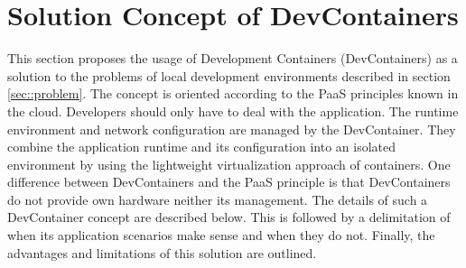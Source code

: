 

\section{Solution Concept of DevContainers}\label{sec::solution_concept}
This section proposes the usage of Development Containers (DevContainers) as a solution to the problems of local development environments described in section \ref{sec::problem}. The concept is oriented according to the \ac{PaaS} principles known in the cloud. Developers should only have to deal with the application. The runtime environment and network configuration are managed by the DevContainer. They combine the application runtime and its configuration into an isolated environment by using the lightweight virtualization approach of containers. One difference between DevContainers and the \ac{PaaS} principle is that DevContainers do not provide own hardware neither its management. \newline
The details of such a DevContainer concept are described below. This is followed by a delimitation of when its application scenarios make sense and when they do not. Finally, the advantages and limitations of this solution are outlined.

